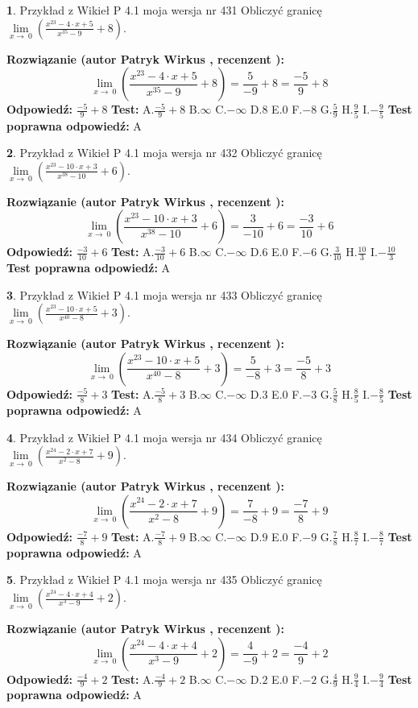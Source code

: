 \documentclass[12pt, a4paper]{article}
\theoremstyle{definition} %
\newtheorem{zad}{}
\newcommand{\zadStart}[1]{\begin{zad}#1\newline}
\newcommand{\zadStop}{\end{zad}}
\newcommand{\rozwStart}[2]{\noindent \textbf{Rozwiązanie (autor #1 , recenzent #2): }\newline}
\newcommand{\rozwStop}{\newline}
\newcommand{\odpStart}{\noindent \textbf{Odpowiedź:}\newline}
\newcommand{\odpStop}{\newline}
\newcommand{\testStart}{\noindent \textbf{Test:}\newline}
\newcommand{\testStop}{\newline}
\newcommand{\kluczStart}{\noindent \textbf{Test poprawna odpowiedź:}\newline}
\newcommand{\kluczStop}{\newline}
\begin{document}
\zadStart{Przykład z Wikieł P 4.1 moja wersja nr 431}
Obliczyć granicę $\lim\limits_{x\to\ 0}(\frac{x^{23}-4 \cdot x +5}{x^{35}-9}+8)$.
\zadStop
\rozwStart{Patryk Wirkus}{}
$$\lim\limits_{x\to\ 0}(\frac{x^{23}-4 \cdot x +5}{x^{35}-9}+8)=\frac{5}{-9}+8=\frac{-5}{9}+8$$
\rozwStop
\odpStart
$\frac{-5}{9}+8$
\odpStop
\testStart
A.$\frac{-5}{9}+8$
B.$\infty$
C.$-\infty$
D.$8$
E.$0$
F.$-8$
G.$\frac{5}{9}$
H.$\frac{9}{5}$
I.$-\frac{9}{5}$
\testStop
\kluczStart
A
\kluczStop



\zadStart{Przykład z Wikieł P 4.1 moja wersja nr 432}
Obliczyć granicę $\lim\limits_{x\to\ 0}(\frac{x^{23}-10 \cdot x +3}{x^{38}-10}+6)$.
\zadStop
\rozwStart{Patryk Wirkus}{}
$$\lim\limits_{x\to\ 0}(\frac{x^{23}-10 \cdot x +3}{x^{38}-10}+6)=\frac{3}{-10}+6=\frac{-3}{10}+6$$
\rozwStop
\odpStart
$\frac{-3}{10}+6$
\odpStop
\testStart
A.$\frac{-3}{10}+6$
B.$\infty$
C.$-\infty$
D.$6$
E.$0$
F.$-6$
G.$\frac{3}{10}$
H.$\frac{10}{3}$
I.$-\frac{10}{3}$
\testStop
\kluczStart
A
\kluczStop



\zadStart{Przykład z Wikieł P 4.1 moja wersja nr 433}
Obliczyć granicę $\lim\limits_{x\to\ 0}(\frac{x^{23}-10 \cdot x +5}{x^{40}-8}+3)$.
\zadStop
\rozwStart{Patryk Wirkus}{}
$$\lim\limits_{x\to\ 0}(\frac{x^{23}-10 \cdot x +5}{x^{40}-8}+3)=\frac{5}{-8}+3=\frac{-5}{8}+3$$
\rozwStop
\odpStart
$\frac{-5}{8}+3$
\odpStop
\testStart
A.$\frac{-5}{8}+3$
B.$\infty$
C.$-\infty$
D.$3$
E.$0$
F.$-3$
G.$\frac{5}{8}$
H.$\frac{8}{5}$
I.$-\frac{8}{5}$
\testStop
\kluczStart
A
\kluczStop



\zadStart{Przykład z Wikieł P 4.1 moja wersja nr 434}
Obliczyć granicę $\lim\limits_{x\to\ 0}(\frac{x^{24}-2 \cdot x +7}{x^{2}-8}+9)$.
\zadStop
\rozwStart{Patryk Wirkus}{}
$$\lim\limits_{x\to\ 0}(\frac{x^{24}-2 \cdot x +7}{x^{2}-8}+9)=\frac{7}{-8}+9=\frac{-7}{8}+9$$
\rozwStop
\odpStart
$\frac{-7}{8}+9$
\odpStop
\testStart
A.$\frac{-7}{8}+9$
B.$\infty$
C.$-\infty$
D.$9$
E.$0$
F.$-9$
G.$\frac{7}{8}$
H.$\frac{8}{7}$
I.$-\frac{8}{7}$
\testStop
\kluczStart
A
\kluczStop



\zadStart{Przykład z Wikieł P 4.1 moja wersja nr 435}
Obliczyć granicę $\lim\limits_{x\to\ 0}(\frac{x^{24}-4 \cdot x +4}{x^{3}-9}+2)$.
\zadStop
\rozwStart{Patryk Wirkus}{}
$$\lim\limits_{x\to\ 0}(\frac{x^{24}-4 \cdot x +4}{x^{3}-9}+2)=\frac{4}{-9}+2=\frac{-4}{9}+2$$
\rozwStop
\odpStart
$\frac{-4}{9}+2$
\odpStop
\testStart
A.$\frac{-4}{9}+2$
B.$\infty$
C.$-\infty$
D.$2$
E.$0$
F.$-2$
G.$\frac{4}{9}$
H.$\frac{9}{4}$
I.$-\frac{9}{4}$
\testStop
\kluczStart
A
\kluczStop
\end{document}
